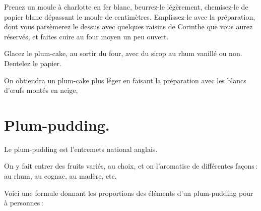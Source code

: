 Prenez un moule à charlotte en fer blanc, beurrez-le légèrement, chemisez-le de
papier blanc dépassant le moule de {\mmm} centimètres. Emplissez-le avec
la préparation, dont vous parsèmerez le dessus avec quelques raisins de Corinthe
que vous aurez réservés, et faites cuire au four moyen un peu ouvert.

Glacez le plum-cake, au sortir du four, avec du sirop au rhum vanillé ou non.
Dentelez le papier.

\sk

On obtiendra un plum-cake plus léger en faisant la préparation avec les blancs
d'œufs montés en neige,

\section*{\centering Plum-pudding.}
{}

Le plum-pudding est l'entremets national anglais.

On y fait entrer des fruits variés, au choix, et on l'aromatise de différentes
façons : au rhum, au cognac, au madère, etc.

\medskip

Voici une formule donnant les proportions des éléments d'un plum-pudding pour
{\mmm} à {\mmm} personnes :

